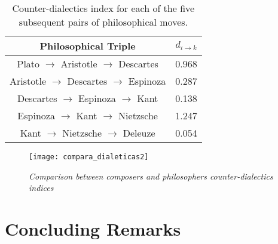 \documentclass[
 aip,
 jmp,
 amsmath,amssymb,
 reprint,
]{revtex4-1}
\begin{document}
\begin{table}%
\caption{\label{tab:tablephiE} Counter-dialectics index for each
of the five subsequent pairs of philosophical moves.}

\begin{tabular}{|c||c|}
\hline
Philosophical Triple & $d_{i \rightarrow k}$ \\
\hline \hline
Plato $\rightarrow$ Aristotle $\rightarrow$ Descartes    & 0.968 \\
Aristotle $\rightarrow$ Descartes $\rightarrow$ Espinoza & 0.287 \\
Descartes $\rightarrow$ Espinoza $\rightarrow$ Kant      & 0.138 \\
Espinoza $\rightarrow$ Kant $\rightarrow$ Nietzsche      & 1.247 \\
Kant $\rightarrow$ Nietzsche $\rightarrow$ Deleuze       & 0.054 \\
\hline
\end{tabular}
\end{table}

\begin{figure}[ht]
        \begin{center}
                \texttt{[image: compara\_dialeticas2]}
        \end{center}
        \caption{\it Comparison between composers and philosophers
          counter-dialectics indices}
        \label{fig:comparingdialectics}
\end{figure}

\section{Concluding Remarks}
\end{document}

